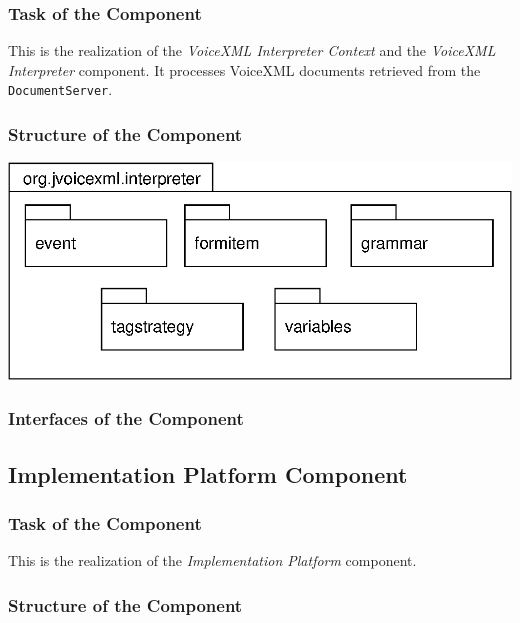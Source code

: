 \documentclass[11pt,a4paper]{article}
\begin{document}
\subsubsection{Task of the Component}

This is the realization of the 
\emph{VoiceXML Interpreter Context} and the \emph{VoiceXML Interpreter}
component. It processes VoiceXML documents retrieved from the
\texttt{DocumentServer}.

\subsubsection{Structure of the Component}

\begin{center}
\includegraphics{package-org.jvoicexml.interpreter.eps}
\end{center}

\subsubsection{Interfaces of the Component}

\subsection{Implementation Platform Component}
\label{sec:impl-platf-comp}

\subsubsection{Task of the Component}

This is the realization of the \emph{Implementation Platform}
component.

\subsubsection{Structure of the Component}
\end{document}
